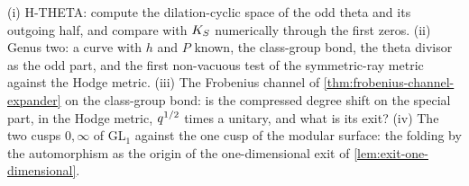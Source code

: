 \begin{observation}
\label{obs:gl1-bond-next}
(i) H-THETA: compute the dilation-cyclic space of the odd theta and its outgoing half, and compare with $K_S$
numerically through the first zeros. (ii) Genus two: a curve with $h$ and $P$ known, the class-group bond, the
theta divisor as the odd part, and the first non-vacuous test of the symmetric-ray metric against the Hodge metric.
(iii) The Frobenius channel of \cref{thm:frobenius-channel-expander} on the class-group bond: is the compressed
degree shift on the special part, in the Hodge metric, $q^{1/2}$ times a unitary, and what is its exit?
(iv) The two cusps $0,\infty$ of GL$_1$ against the one cusp of the modular surface: the folding by the
automorphism as the origin of the one-dimensional exit of \cref{lem:exit-one-dimensional}.
\end{observation}
